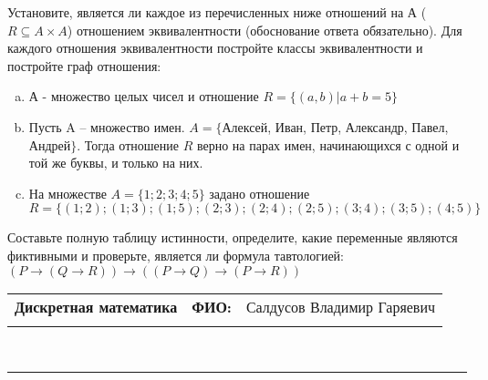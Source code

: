 \documentclass[10pt]{exam}
\newcommand{\class}{Дискретная математика}
\newcommand{\examdate}{}
\begin{document}
\begin{questions}
\question
Установите, является ли каждое из перечисленных ниже отношений на А ($R \subseteq A \times A$) отношением эквивалентности (обоснование ответа обязательно). Для каждого отношения эквивалентности постройте классы 
эквивалентности и постройте граф отношения:
\begin{enumerate} [a)]\setcounter{enumi}{0}
\item А - множество целых чисел и отношение $R = \{(a,b)|a + b = 5\}$
\item Пусть A – множество имен. $A = \{ $Алексей, Иван, Петр, Александр, Павел, Андрей$ \}$. Тогда отношение $R $ верно на парах имен, начинающихся с одной и той же буквы, и только на них.
\item На множестве $A = \{1; 2; 3; 4; 5\}$ задано отношение $R = \{(1; 2); (1; 3); (1; 5); (2; 3); (2; 4); (2; 5); (3; 4); (3; 5); (4; 5)\}$
\end{enumerate}\question Составьте полную таблицу истинности, определите, какие переменные являются фиктивными и проверьте, является ли формула тавтологией:
$(P \rightarrow (Q \rightarrow R)) \rightarrow ((P \rightarrow Q) \rightarrow (P \rightarrow R))$

\end{questions}
\newpage
\begin{flushright}
\begin{tabular}{p{2.8in} r l}
\textbf{\class} & \textbf{ФИО:} &Салдусов Владимир Гаряевич
\\

\textbf{\examdate} &&\\
\end{tabular}\\
\end{flushright}
\rule[1ex]{\textwidth}{.1pt}
\end{document}
